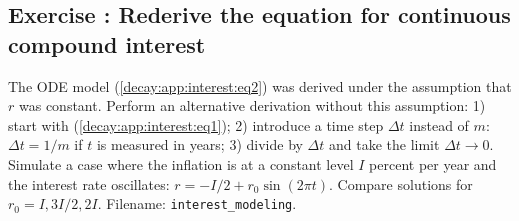 \documentclass[%
oneside,                 %
final,                   %
10pt]{article}
\newenvironment{doconceexercise}{}{}
\newcounter{doconceexercisecounter}
\begin{document}
\begin{doconceexercise}

\subsection*{Exercise \thedoconceexercisecounter: Rederive the equation for continuous compound interest}

\label{decay:app:exer:interest:derive}

The ODE model (\ref{decay:app:interest:eq2}) was derived under the assumption
that $r$ was constant. Perform an alternative derivation without
this assumption: 1) start with (\ref{decay:app:interest:eq1});
2) introduce a time step $\Delta t$ instead of $m$: $\Delta t = 1/m$ if
$t$ is measured in years; 3) divide by $\Delta t$ and take the
limit $\Delta t\rightarrow 0$. Simulate a case where the inflation is
at a constant level $I$ percent per year and the interest rate oscillates:
$r=-I/2 + r_0\sin(2\pi t)$.
Compare solutions for $r_0=I, 3I/2, 2I$.
\noindent Filename: \Verb!interest_modeling!.

\end{doconceexercise}
\end{document}
